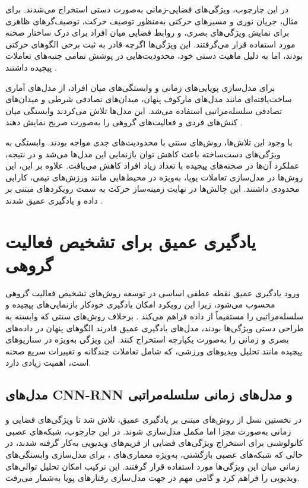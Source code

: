 \documentclass[12pt]{report}
\begin{document}
در این چارچوب، ویژگی‌های فضایی-زمانی به‌صورت دستی استخراج می‌شدند. برای مثال، جریان نوری و مسیرهای حرکتی به‌منظور توصیف حرکت، توصیف‌گرهای ظاهری برای نمایش ویژگی‌های بصری، و روابط فضایی میان افراد برای درک ساختار صحنه مورد استفاده قرار می‌گرفتند. این ویژگی‌ها اگرچه قادر به ثبت برخی الگوهای حرکتی بودند، اما به دلیل ماهیت دستی خود، محدودیت‌هایی در پوشش تمامی جنبه‌های تعاملات پیچیده داشتند \cite{eight}.

برای مدل‌سازی پویایی‌های زمانی و وابستگی‌های میان افراد، از مدل‌های آماری ساخت‌یافته‌ای مانند مدل‌های مارکوف پنهان، میدان‌های تصادفی شرطی و میدان‌های تصادفی سلسله‌مراتبی استفاده می‌شد. این مدل‌ها تلاش می‌کردند وابستگی میان کنش‌های فردی و فعالیت‌های گروهی را به‌صورت صریح نمایش دهند \cite{nine,ten}.

با وجود این تلاش‌ها، روش‌های سنتی با محدودیت‌های جدی مواجه بودند. وابستگی به ویژگی‌های دست‌ساخته باعث کاهش توان بازنمایی این مدل‌ها می‌شد و در نتیجه، عملکرد آن‌ها در صحنه‌های پیچیده با تعداد زیاد افراد کاهش می‌یافت. علاوه بر این، این روش‌ها در مدل‌سازی تعاملات پویا، به‌ویژه در محیط‌هایی مانند ورزش‌های تیمی، کارایی محدودی داشتند. این چالش‌ها در نهایت زمینه‌ساز حرکت به سمت رویکردهای مبتنی بر داده و یادگیری عمیق شدند \cite{three,four}.


\section{یادگیری عمیق برای تشخیص فعالیت گروهی}
ورود یادگیری عمیق نقطه عطفی اساسی در توسعه روش‌های تشخیص فعالیت گروهی محسوب می‌شود، زیرا این رویکرد امکان یادگیری خودکار بازنمایی‌های پیچیده و سلسله‌مراتبی را مستقیماً از داده فراهم می‌کند \cite{three,twelve}. برخلاف روش‌های سنتی که وابسته به طراحی دستی ویژگی‌ها بودند، مدل‌های یادگیری عمیق قادرند الگوهای پنهان در داده‌های بصری و زمانی را به‌صورت یکپارچه استخراج کنند. این ویژگی به‌ویژه در سناریوهای پیچیده مانند تحلیل ویدیوهای ورزشی، که شامل تعاملات چندگانه و تغییرات سریع صحنه است، اهمیت زیادی دارد.

\subsection{مدل‌های CNN-RNN و مدل‌های زمانی سلسله‌مراتبی}
در نخستین نسل از روش‌های مبتنی بر یادگیری عمیق، تلاش شد تا ویژگی‌های فضایی و زمانی به‌صورت مجزا اما مکمل مدل‌سازی شوند. در این چارچوب، شبکه‌های عصبی کانولوشنی برای استخراج ویژگی‌های فضایی از فریم‌های ویدیویی به‌کار گرفته شدند، در حالی که شبکه‌های عصبی بازگشتی، به‌ویژه معماری‌های ، برای مدل‌سازی وابستگی‌های زمانی میان این ویژگی‌ها مورد استفاده قرار گرفتند. این ترکیب امکان تحلیل توالی‌های ویدیویی را فراهم کرد و گامی مهم در جهت مدل‌سازی رفتارهای پویا به‌شمار می‌رفت.
\end{document}
